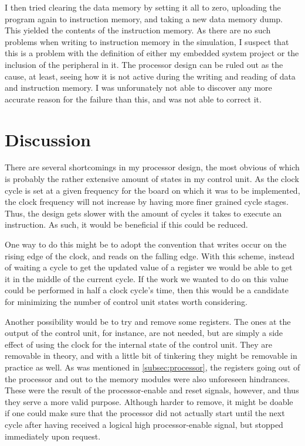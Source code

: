 \documentclass[11pt]{article}
\begin{document}
I then tried clearing the data memory by setting it all to zero,
uploading the program again to instruction memory, and taking a new
data memory dump. This yielded the contents of the instruction
memory. As there are no such problems when writing to instruction
memory in the simulation, I suspect that this is a problem with the
definition of either my embedded system project or the inclusion of
the peripheral in it. The processor design can be ruled out as the
cause, at least, seeing how it is not active during the writing and
reading of data and instruction memory. I was unforunately not able to
discover any more accurate reason for the failure than this, and was
not able to correct it.

\section{Discussion}
\label{sec:discussion}
There are several shortcomings in my processor design, the most
obvious of which is probably the rather extensive amount of states in
my control unit. As the clock cycle is set at a given frequency for
the board on which it was to be implemented, the clock frequency will
not increase by having more finer grained cycle stages. Thus, the
design gets slower with the amount of cycles it takes to execute an
instruction. As such, it would be beneficial if this could be reduced. 

One way to do this might be to adopt the convention that writes occur
on the rising edge of the clock, and reads on the falling edge. With
this scheme, instead of waiting a cycle to get the updated value of a
register we would be able to get it in the middle of the current
cycle. If the work we wanted to do on this value could be performed in
half a clock cycle's time, then this would be a candidate for
minimizing the number of control unit states worth considering.

Another possibility would be to try and remove some registers. The
ones at the output of the control unit, for instance, are not needed,
but are simply a side effect of using the clock for the internal state
of the control unit. They are removable in theory, and with a little
bit of tinkering they might be removable in practice as well. As was
mentioned in \autoref{subsec:processor}, the registers going out of
the processor and out to the memory modules were also unforeseen
hindrances. These were the result of the processor-enable and reset
signals, however, and thus they serve a more valid purpose. Although
harder to remove, it might be doable if one could make sure that the
processor did not actually start until the next cycle after having
received a logical high processor-enable signal, but stopped
immediately upon request.
\end{document}
